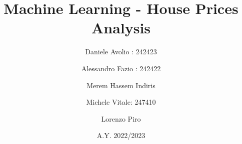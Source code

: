 \documentclass[12]{report}
\begin{document}
\title{Machine Learning - House Prices Analysis}
\author{Daniele Avolio : 242423\\
    \and
    Alessandro Fazio : 242422\\
    \and
    Merem Hassem Indiris\\
    \and
    Michele Vitale: 247410\\
    \and
    Lorenzo Piro\\}
\date{A.Y. 2022/2023}
\maketitle


\begin{titlepage}
    \noindent{}
\end{titlepage}

\tableofcontents



\newpage








\end{document}
